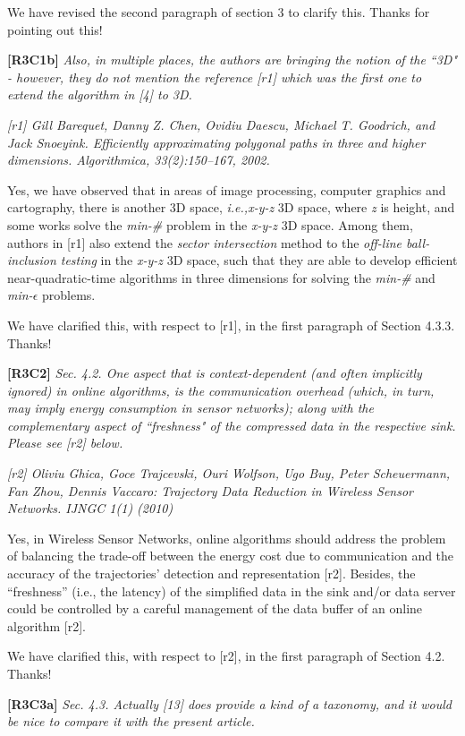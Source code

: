 \documentclass{letter}
\newcommand{\ie}{\emph{i.e.,}\xspace}
\begin{document}
{We have revised the second paragraph of section 3 to clarify this. Thanks for pointing out this!

\textbf{[R3C1b]} \emph{Also, in multiple places, the authors are bringing the notion of the ``3D" - however, they do not mention the reference [r1] which was the first one to extend the algorithm in [4] to 3D. }

\emph{[r1] Gill Barequet, Danny Z. Chen, Ovidiu Daescu, Michael T. Goodrich, and Jack Snoeyink. Efficiently approximating polygonal paths in three and higher dimensions. Algorithmica, 33(2):150–167, 2002.}

Yes, we have observed that in areas of image processing, computer graphics and cartography, there is another 3D space, \ie \emph{x-y-z} 3D space, where {\em z} is height, and some works solve the \emph{min-\#} problem in the \emph{x-y-z} 3D space. Among them, authors in [r1] also extend the \textit{sector intersection} method to the \textit{off-line ball-inclusion testing} in the \emph{x-y-z} 3D space, such that they are able to develop efficient near-quadratic-time algorithms in three dimensions for solving the \emph{min-\#} and \emph{min-$\epsilon$} problems.} %

We have clarified this, with respect to [r1], in the first paragraph of Section 4.3.3. Thanks!

\textbf{[R3C2]} \emph{
Sec. 4.2. One aspect that is context-dependent (and often implicitly ignored) in online algorithms, is the communication overhead (which, in turn, may imply energy consumption in sensor networks); along with the complementary aspect of ``freshness" of the compressed data in the respective sink. Please see [r2] below.}

\emph{[r2] Oliviu Ghica, Goce Trajcevski, Ouri Wolfson, Ugo Buy, Peter Scheuermann, Fan Zhou, Dennis Vaccaro: Trajectory Data Reduction in Wireless Sensor Networks. IJNGC 1(1) (2010)
}

{Yes, in Wireless Sensor Networks, online algorithms should address the problem of balancing the trade-off between the energy cost due to communication and the accuracy of the trajectories’ detection and representation [r2].} Besides, the ``freshness” (i.e., the latency) of the simplified data in the sink and/or data server could be controlled by a careful management of the data buffer of an online algorithm [r2].

We have clarified this, with respect to [r2], in the first paragraph of Section 4.2. 
Thanks!

\textbf{[R3C3a]} \emph{
Sec. 4.3. Actually [13] does provide a kind of a taxonomy, and it would be nice to compare it with the present article. }
\end{document}

